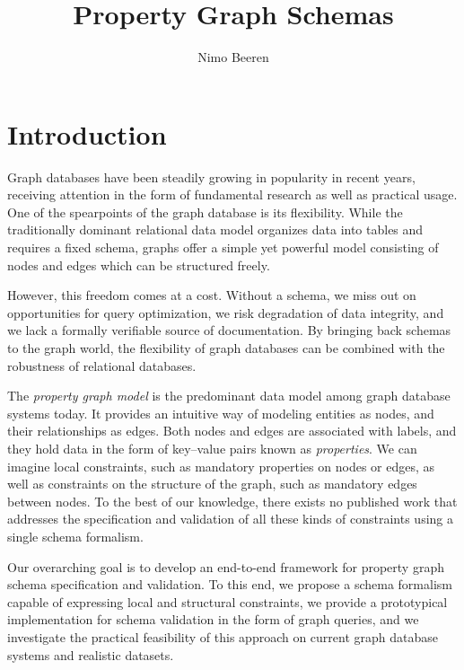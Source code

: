 \documentclass{report}
\title{Property Graph Schemas}
\author{Nimo Beeren}
\theoremstyle{definition}
\begin{document}
\maketitle

\renewcommand{\thepage}{\roman{page}}

\tableofcontents
\listoffigures
\listoftables
\lstlistoflistings

\chapter{Introduction}
\setcounter{page}{1}
\renewcommand{\thepage}{\arabic{page}}

Graph databases have been steadily growing in popularity in recent years, receiving attention in the form of fundamental research as well as practical usage. One of the spearpoints of the graph database is its flexibility. While the traditionally dominant relational data model organizes data into tables and requires a fixed schema, graphs offer a simple yet powerful model consisting of nodes and edges which can be structured freely.

However, this freedom comes at a cost. Without a schema, we miss out on opportunities for query optimization, we risk degradation of data integrity, and we lack a formally verifiable source of documentation. By bringing back schemas to the graph world, the flexibility of graph databases can be combined with the robustness of relational databases.

The \emph{property graph model} is the predominant data model among graph database systems today. It provides an intuitive way of modeling entities as nodes, and their relationships as edges. Both nodes and edges are associated with labels, and they hold data in the form of key--value pairs known as \emph{properties}. We can imagine local constraints, such as mandatory properties on nodes or edges, as well as constraints on the structure of the graph, such as mandatory edges between nodes. To the best of our knowledge, there exists no published work that addresses the specification and validation of all these kinds of constraints using a single schema formalism.

Our overarching goal is to develop an end-to-end framework for property graph schema specification and validation. To this end, we propose a schema formalism capable of expressing local and structural constraints, we provide a prototypical implementation for schema validation in the form of graph queries, and we investigate the practical feasibility of this approach on current graph database systems and realistic datasets.
\end{document}
